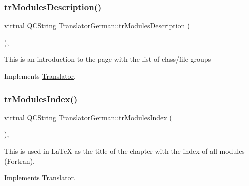 \mbox{\label{class_translator_german_a06b58e5ff088855f09c5807b1015f086}} 
\subsubsection{\texorpdfstring{trModulesDescription()}{trModulesDescription()}}
{\footnotesize\ttfamily virtual \mbox{\hyperlink{class_q_c_string}{Q\+C\+String}} Translator\+German\+::tr\+Modules\+Description (\begin{DoxyParamCaption}{ }\end{DoxyParamCaption})\hspace{0.3cm}{\ttfamily [inline]}, {\ttfamily [virtual]}}

This is an introduction to the page with the list of class/file groups 

Implements \mbox{\hyperlink{class_translator}{Translator}}.

\mbox{\label{class_translator_german_ab54fd39ef008d1bb19cc22f9a2b1f5a6}} 
\subsubsection{\texorpdfstring{trModulesIndex()}{trModulesIndex()}}
{\footnotesize\ttfamily virtual \mbox{\hyperlink{class_q_c_string}{Q\+C\+String}} Translator\+German\+::tr\+Modules\+Index (\begin{DoxyParamCaption}{ }\end{DoxyParamCaption})\hspace{0.3cm}{\ttfamily [inline]}, {\ttfamily [virtual]}}

This is used in La\+TeX as the title of the chapter with the index of all modules (Fortran). 

Implements \mbox{\hyperlink{class_translator}{Translator}}.

\mbox{\label{class_translator_german_a18bc0a7e6b0d22174bf95f0f1ccff27b}} 
